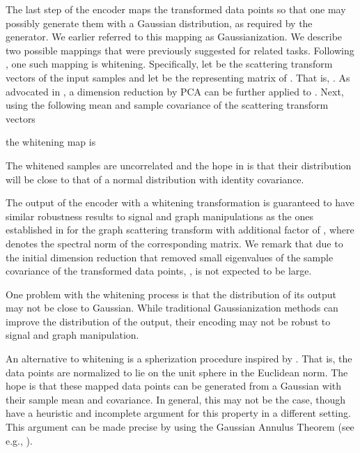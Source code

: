 \documentclass[conference]{IEEEtran}
\begin{document}
The last step of the encoder maps the transformed data points so that one may possibly generate them with a Gaussian distribution, as required by the generator. We earlier referred to this mapping as Gaussianization. We describe two possible mappings that were previously suggested for related tasks. Following \cite{angles2018generative}, one such mapping is whitening. Specifically, let
  be the scattering transform vectors of the input samples and let  be the representing matrix of . That is, . As advocated in  \cite{angles2018generative}, a dimension reduction by PCA can be further applied to . Next, using the following mean and sample covariance of the scattering transform vectors

the whitening map  is 

The whitened samples are uncorrelated and the hope in \cite{angles2018generative} is that their distribution will be close to that of a normal distribution with identity covariance. 

The output of the encoder with a whitening transformation is guaranteed to have similar robustness results to signal and graph manipulations as the ones established in \cite{zou2018graph} for the graph scattering transform with additional factor of , where  denotes the spectral norm of the corresponding matrix. We remark that due to the initial dimension reduction that removed small eigenvalues of the sample covariance of the transformed data points, , is not expected to be large.

One problem with the whitening process is that the distribution of its output may not be close to Gaussian. While traditional Gaussianization methods \cite{chen2001gaussianization, laparra2011iterative} can improve the distribution of the output, their encoding may not be robust to signal and graph manipulation.

An alternative to whitening is a spherization procedure inspired by \cite{bojanowski2018optimizing}.
That is, the data points  are normalized to lie on the unit sphere in the Euclidean norm. The hope is that these mapped data points can be generated from a Gaussian with their sample mean and covariance. In general, this may not be the case, though \cite{bojanowski2018optimizing} have a heuristic and incomplete argument for this property in a different setting. This argument {can be made precise by using} the Gaussian Annulus Theorem (see e.g., \cite[Theorem 2.9]{blum2017foundation}). 
\end{document}
